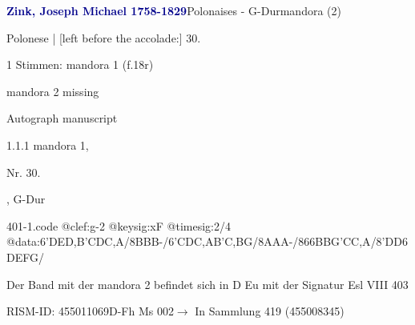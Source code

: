\documentclass[twocolumn, 12pt]{book}
\begin{document}
\par \vspace{16pt} \textcolor{darkblue}{\textbf{Zink, Joseph Michael  1758-1829}}\hfillplus{\textbf{[401]}}\newline Polonaises - G-Dur\newline mandora (2)
\par \begin{itshape}[f.18r, at left:] Polonese | [left before the accolade:] 30.\end{itshape} 
\par \textcolor{darkblue}{}  1 Stimmen: mandora 1  (f.18r)\newline \begin{small} mandora 2 missing\end{small} \newline Autograph manuscript
\par 1.1.1  mandora 1, \begin{itshape}Nr. 30.\end{itshape}, G-Dur  
\begin{filecontents*}{401-1.code}
@clef:g-2
@keysig:xF
@timesig:2/4
@data:6'DED,B'CDC,A/8BBB-/6'CDC,AB'C,BG/8AAA-/866{BBG}{'CC,A}/8'DD{6DE}{FG}/
\end{filecontents*}
\newline %
\par Der Band mit der mandora 2 befindet sich in D Eu mit der Signatur Esl VIII 403
\par RISM-ID: 455011069\newline D-Fh  Ms 002\newline $\rightarrow$ In Sammlung 419 (455008345)
      
\end{document}
